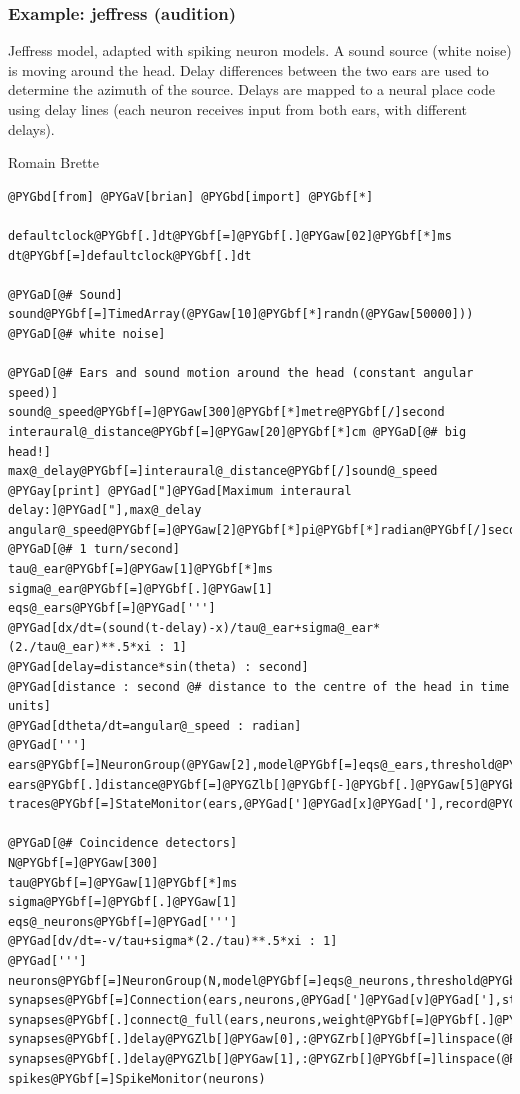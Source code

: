 \documentclass[letterpaper,10pt,english]{manual}
\begin{document}
\hypertarget{index-28}{}\subsubsection{Example: jeffress (audition)}

Jeffress model, adapted with spiking neuron models.
A sound source (white noise) is moving around the head.
Delay differences between the two ears are used to determine the azimuth of the source.
Delays are mapped to a neural place code using delay lines (each neuron receives input
from both ears, with different delays).

Romain Brette

\begin{Verbatim}[commandchars=@\[\]]
@PYGbd[from] @PYGaV[brian] @PYGbd[import] @PYGbf[*]

defaultclock@PYGbf[.]dt@PYGbf[=]@PYGbf[.]@PYGaw[02]@PYGbf[*]ms
dt@PYGbf[=]defaultclock@PYGbf[.]dt

@PYGaD[@# Sound]
sound@PYGbf[=]TimedArray(@PYGaw[10]@PYGbf[*]randn(@PYGaw[50000])) @PYGaD[@# white noise]

@PYGaD[@# Ears and sound motion around the head (constant angular speed)]
sound@_speed@PYGbf[=]@PYGaw[300]@PYGbf[*]metre@PYGbf[/]second
interaural@_distance@PYGbf[=]@PYGaw[20]@PYGbf[*]cm @PYGaD[@# big head!]
max@_delay@PYGbf[=]interaural@_distance@PYGbf[/]sound@_speed
@PYGay[print] @PYGad["]@PYGad[Maximum interaural delay:]@PYGad["],max@_delay
angular@_speed@PYGbf[=]@PYGaw[2]@PYGbf[*]pi@PYGbf[*]radian@PYGbf[/]second @PYGaD[@# 1 turn/second]
tau@_ear@PYGbf[=]@PYGaw[1]@PYGbf[*]ms
sigma@_ear@PYGbf[=]@PYGbf[.]@PYGaw[1]
eqs@_ears@PYGbf[=]@PYGad[''']
@PYGad[dx/dt=(sound(t-delay)-x)/tau@_ear+sigma@_ear*(2./tau@_ear)**.5*xi : 1]
@PYGad[delay=distance*sin(theta) : second]
@PYGad[distance : second @# distance to the centre of the head in time units]
@PYGad[dtheta/dt=angular@_speed : radian]
@PYGad[''']
ears@PYGbf[=]NeuronGroup(@PYGaw[2],model@PYGbf[=]eqs@_ears,threshold@PYGbf[=]@PYGaw[1],reset@PYGbf[=]@PYGaw[0],refractory@PYGbf[=]@PYGaw[2.5]@PYGbf[*]ms)
ears@PYGbf[.]distance@PYGbf[=]@PYGZlb[]@PYGbf[-]@PYGbf[.]@PYGaw[5]@PYGbf[*]max@_delay,@PYGbf[.]@PYGaw[5]@PYGbf[*]max@_delay@PYGZrb[]
traces@PYGbf[=]StateMonitor(ears,@PYGad[']@PYGad[x]@PYGad['],record@PYGbf[=]@PYGaA[True])

@PYGaD[@# Coincidence detectors]
N@PYGbf[=]@PYGaw[300]
tau@PYGbf[=]@PYGaw[1]@PYGbf[*]ms
sigma@PYGbf[=]@PYGbf[.]@PYGaw[1]
eqs@_neurons@PYGbf[=]@PYGad[''']
@PYGad[dv/dt=-v/tau+sigma*(2./tau)**.5*xi : 1]
@PYGad[''']
neurons@PYGbf[=]NeuronGroup(N,model@PYGbf[=]eqs@_neurons,threshold@PYGbf[=]@PYGaw[1],reset@PYGbf[=]@PYGaw[0])
synapses@PYGbf[=]Connection(ears,neurons,@PYGad[']@PYGad[v]@PYGad['],structure@PYGbf[=]@PYGad[']@PYGad[dense]@PYGad['],delay@PYGbf[=]@PYGaA[True],max@_delay@PYGbf[=]@PYGaw[1.1]@PYGbf[*]max@_delay)
synapses@PYGbf[.]connect@_full(ears,neurons,weight@PYGbf[=]@PYGbf[.]@PYGaw[5])
synapses@PYGbf[.]delay@PYGZlb[]@PYGaw[0],:@PYGZrb[]@PYGbf[=]linspace(@PYGaw[0]@PYGbf[*]ms,@PYGaw[1.1]@PYGbf[*]max@_delay,N)
synapses@PYGbf[.]delay@PYGZlb[]@PYGaw[1],:@PYGZrb[]@PYGbf[=]linspace(@PYGaw[0]@PYGbf[*]ms,@PYGaw[1.1]@PYGbf[*]max@_delay,N)@PYGZlb[]::@PYGbf[-]@PYGaw[1]@PYGZrb[]
spikes@PYGbf[=]SpikeMonitor(neurons)


\end{Verbatim}
\end{document}

